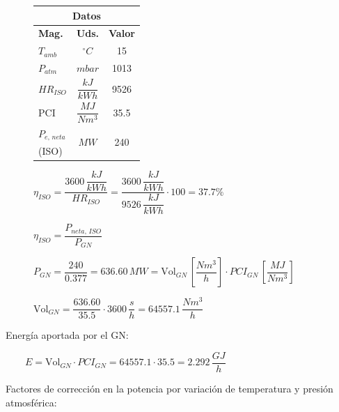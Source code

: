 			\begin{figure}[H]
				\begin{minipage}{0.325\textwidth}
					\begin{table}[H]
						\renewcommand{\arraystretch}{1.2}
						\centering
						\begin{tabular}{lcc}
							\multicolumn{3}{c}{\textbf{Datos}}\\
							\hline
							\textbf{Mag.} & \textbf{Uds.} & \textbf{Valor}\\
							\hline
							$T_{amb}$ & $^\circ C$ & 15\\
							\hline
							$P_{atm}$ & $mbar$ & 1013\\
							\hline
							\multirow{2}{*}{$H\!R_{ISO}$} & \multirow{2}{*}{$\dfrac{kJ}{kWh}$} & \multirow{2}{*}{9526}\\
							&&\\
							\hline
							\multirow{2}{*}{PCI} & \multirow{2}{*}{$\dfrac{MJ}{Nm^3}$} & \multirow{2}{*}{35.5}\\
							&&\\
							\hline
							$P_{e,\,neta}$ & \multirow{2}{*}{$MW$} & \multirow{2}{*}{240}\\
							(ISO)&&
						\end{tabular}
					\end{table}
				\end{minipage}
				\begin{minipage}{0.675\textwidth}
					$\eta_{ISO} = \dfrac{3600\,\dfrac{kJ}{kWh}}{H\!R_{ISO}} = \dfrac{3600\,\dfrac{kJ}{kWh}}{9526\,\dfrac{kJ}{kWh}}\cdot 100 = 37.7\%$
				
					$\eta_{ISO} = \dfrac{P_{neta,\,ISO}}{P_{GN}}$
					
					$P_{GN} = \dfrac{240}{0.377} = 636.60\,MW = \text{Vol}_{GN}\,\left[\dfrac{Nm^3}{h}\right] \cdot PCI_{GN}\,\left[\dfrac{MJ}{Nm^3}\right]$
					
					$\text{Vol}_{GN} = \dfrac{636.60}{35.5}\cdot 3600\,\dfrac{s}{h} = 64557.1\,\dfrac{Nm^3}{h}$
				\end{minipage}
			\end{figure}
			
			Energía aportada por el GN: 
			
			$\qquad E = \text{Vol}_{GN} \cdot PCI_{GN} = 64557.1 \cdot 35.5 = 2.292\,\dfrac{GJ}{h}$
			
			\vspace{0.2cm}
			Factores de corrección en la potencia por variación de temperatura y presión atmosférica:
			
